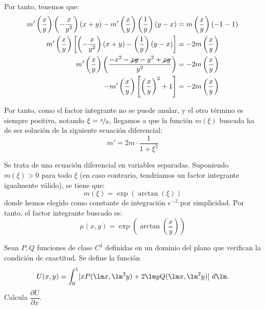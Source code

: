 \documentclass[12pt]{article}
\begin{document}
\begin{ejercicio}
\begin{enumerate}
        Por tanto, tenemos que:
        \begin{align*}
            m'\left(\frac{x}{y}\right)\left(-\frac{x}{y^2}\right)(x+y)-m'\left(\frac{x}{y}\right)\left(\frac{1}{y}\right)(y-x)&=m\left(\frac{x}{y}\right)(-1-1)\\
            m'\left(\frac{x}{y}\right)\left[\left(-\frac{x}{y^2}\right)(x+y)-\left(\frac{1}{y}\right)(y-x)\right]&=-2m\left(\frac{x}{y}\right)\\
            m'\left(\frac{x}{y}\right)\left(\frac{-x^2-\cancel{xy}-y^2+\cancel{xy}}{y^2}\right)&=-2m\left(\frac{x}{y}\right)\\
            -m'\left(\frac{x}{y}\right)\left[\left(\frac{x}{y}\right)^2+1\right]&=-2m\left(\frac{x}{y}\right)
        \end{align*}

        Por tanto, como el factor integrante no se puede anular, y el otro término es siempre positiva, notando $\xi=\nicefrac{x}{y}$, llegamos a que la función $m(\xi)$ buscada ha de ser solución de la siguiente ecuación diferencial:
        \begin{equation*}
            m'=2m\cdot \frac{1}{1+\xi^2}
        \end{equation*}

        Se trata de una ecuación diferencial en variables separadas. Suponiendo $m(\xi)>0$ para todo $\xi$ (en caso contrario, tendríamos un factor integrante igualmente válido), se tiene que:
        \begin{equation*}
            m(\xi)=\exp(\arctan(\xi))
        \end{equation*}
        donde hemos elegido como constante de integración $e^{-2}$ por simplicidad. Por tanto, el factor integrante buscado es:
        \begin{equation*}
            \mu(x,y)=\exp\left(\arctan\left(\frac{x}{y}\right)\right)
        \end{equation*}
    \end{enumerate}
\end{ejercicio}

\begin{ejercicio}
    Sean $P,Q$ funciones de clase $C^1$ definidas en un dominio del plano que verifican la condición de exactitud. Se define la función
    \begin{equation*}
        U(x,y)=\int_{0}^{1}[xP(\lm x,\lm^2 y)+2\lm yQ(\lm x,\lm^2 y)]~d\lm.
    \end{equation*}
    Calcula $\dfrac{\partial U}{\partial x}$.\\

    \begin{comment}
    Sea $\Omega$ el dominio del plano descrito. Por ser $P,Q$ funciones de clase $C^1$ en $\Omega$, la función $U$ está bien definida y es de clase $C^1$ en $\Omega$. Por tanto, podemos calcular sus derivadas parciales. Para ello, usamos el teorema fundamental del cálculo en varias variables:
    \end{comment}
\end{ejercicio}

    
\end{document}
